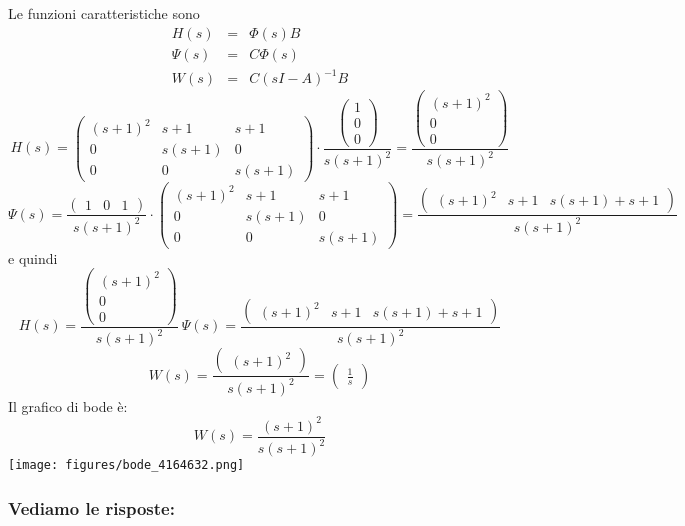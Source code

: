 \documentclass{article}
\begin{document}
Le funzioni caratteristiche sono \[\begin{array}{rcl}  H(s) & = & \Phi(s)B \\ \Psi(s) & = & C \Phi(s)\\ W(s) & = & C(sI-A)^{-1}B  \end{array} \]
\[ H(s) = \left(\begin{matrix}\left(s + 1\right)^{2} & s + 1 & s + 1\\0 & s \left(s + 1\right) & 0\\0 & 0 & s \left(s + 1\right)\end{matrix}\right)\cdot \frac{\left(\begin{matrix}1\\0\\0\end{matrix}\right)}{s \left(s + 1\right)^{2}} = \frac{\left(\begin{matrix}\left(s + 1\right)^{2}\\0\\0\end{matrix}\right)}{s \left(s + 1\right)^{2}} \]\[ \Psi(s) = \frac{\left(\begin{matrix}1 & 0 & 1\end{matrix}\right)}{s \left(s + 1\right)^{2}}\cdot\left(\begin{matrix}\left(s + 1\right)^{2} & s + 1 & s + 1\\0 & s \left(s + 1\right) & 0\\0 & 0 & s \left(s + 1\right)\end{matrix}\right)  = \frac{\left(\begin{matrix}\left(s + 1\right)^{2} & s + 1 & s \left(s + 1\right) + s + 1\end{matrix}\right)}{s \left(s + 1\right)^{2}} \]
e quindi \[ H(s)  =  \frac{\left(\begin{matrix}\left(s + 1\right)^{2}\\0\\0\end{matrix}\right)}{s \left(s + 1\right)^{2}} \ \Psi(s) = \frac{\left(\begin{matrix}\left(s + 1\right)^{2} & s + 1 & s \left(s + 1\right) + s + 1\end{matrix}\right)}{s \left(s + 1\right)^{2}} \]
\[ W(s)  =  \frac{\left(\begin{matrix}\left(s + 1\right)^{2}\end{matrix}\right)}{s \left(s + 1\right)^{2}} = \left(\begin{matrix}\frac{1}{s}\end{matrix}\right)  \] 
Il grafico di bode è:
\[ W(s) = \frac{\left(s + 1\right)^{2}}{s \left(s + 1\right)^{2}} \]\texttt{[image: figures/bode\_4164632.png]}


\subsubsection{Vediamo le risposte:} 
\end{document}
